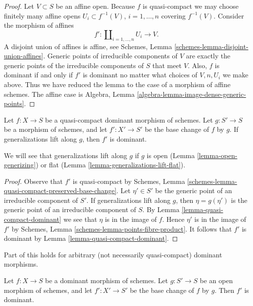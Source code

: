 \begin{proof}
Let $V \subset S$ be an affine open.
Because $f$ is quasi-compact we may choose finitely many affine
opens $U_i \subset f^{-1}(V)$, $i = 1, \ldots, n$ covering
$f^{-1}(V)$. Consider the morphism of affines
$$
f' :
\coprod\nolimits_{i = 1, \ldots, n} U_i
\longrightarrow
V.
$$
A disjoint union of affines is affine, see
Schemes, Lemma \ref{schemes-lemma-disjoint-union-affines}.
Generic points of irreducible components of $V$
are exactly the generic points of the irreducible components of
$S$ that meet $V$. Also, $f$ is dominant if and only if $f'$ is dominant
no matter what choices of $V, n, U_i$ we make above. Thus we
have reduced the lemma to the case of a morphism of affine schemes.
The affine case is
Algebra, Lemma \ref{algebra-lemma-image-dense-generic-points}.
\end{proof}

\begin{lemma}
\label{lemma-base-change-dominant}
Let $f : X \to S$ be a quasi-compact dominant morphism of schemes.
Let $g : S' \to S$ be a morphism of schemes,  and let $f' : X' \to S'$
be the base change of $f$ by $g$. If generalizations lift along $g$,
then $f'$ is dominant.
\end{lemma}

\noindent
We will see that generalizations lift along $g$ if $g$ is open
(Lemma \ref{lemma-open-generizing})
or flat (Lemma \ref{lemma-generalizations-lift-flat}).

\begin{proof}
Observe that $f'$ is quasi-compact by Schemes, Lemma
\ref{schemes-lemma-quasi-compact-preserved-base-change}.
Let $\eta' \in S'$ be the generic point of an irreducible
component of $S'$. If generalizations lift along $g$,
then $\eta = g(\eta')$ is the generic point of an irreducible
component of $S$. By Lemma \ref{lemma-quasi-compact-dominant}
we see that $\eta$ is in the image of $f$.
Hence $\eta'$ is in the image of $f'$ by
Schemes, Lemma \ref{schemes-lemma-points-fibre-product}.
It follows that $f'$ is dominant by Lemma \ref{lemma-quasi-compact-dominant}.
\end{proof}

\noindent
Part of this holds for arbitrary (not necessarily quasi-compact)
dominant morphisms.

\begin{lemma}
\label{lemma-open-base-change-dominant}
Let $f : X \to S$ be a dominant morphism of schemes.
Let $g : S' \to S$ be an open morphism of schemes, and let $f' : X' \to S'$
be the base change of $f$ by $g$. Then $f'$ is dominant.
\end{lemma}


